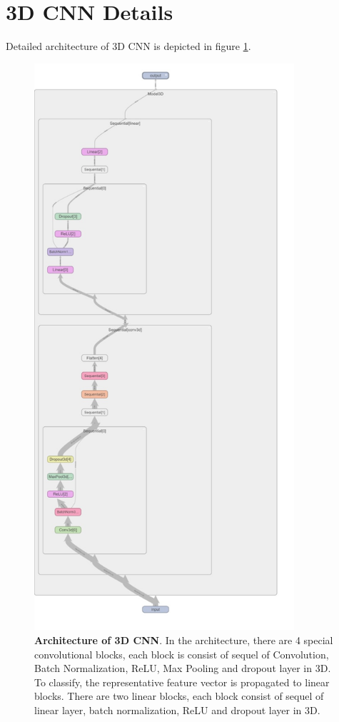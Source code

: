 \documentclass[10pt, twocolumn, letterpaper]{article}
\begin{document}
\section{3D CNN Details}
\label{appendix:D}
Detailed architecture of 3D CNN is depicted in figure \ref{fig:3dcnn}.
\begin{figure}
\centering
 \includegraphics[width=0.8\linewidth, height = 21cm]{images/3dcnn.jpeg}
   \caption{\textbf{Architecture of 3D CNN}. In the architecture, there are 4 special convolutional blocks, each block is consist of sequel of Convolution, Batch Normalization, ReLU, Max Pooling and dropout layer in 3D. To classify, the representative feature vector is propagated to linear blocks. There are two linear blocks, each block consist of sequel of linear layer, batch normalization, ReLU and dropout layer in 3D.}
\label{fig:3dcnn}
\end{figure}
\end{document}
